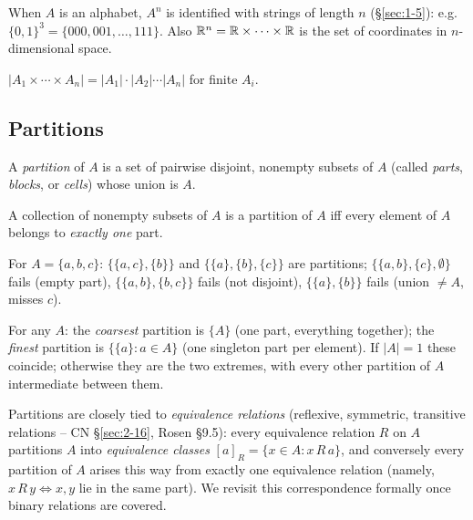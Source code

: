 \documentclass[11pt]{article}
\begin{document}
\begin{note}
When $A$ is an alphabet, $A^n$ is identified with strings of length $n$ (\S\ref{sec:1-5}): e.g.\ $\{0,1\}^3 = \{000,001,\dots,111\}$. Also $\mathbb{R}^n = \mathbb{R}\times\cdots\times\mathbb{R}$ is the set of coordinates in $n$-dimensional space.
\end{note}

\begin{theorem}
$|A_1 \times \cdots \times A_n| = |A_1| \cdot |A_2| \cdots |A_n|$ for finite $A_i$.
\end{theorem}

\subsection{Partitions}
\label{sec:1-15}
\begin{definition}[Partition]
A \emph{partition} of $A$ is a set of pairwise disjoint, nonempty subsets of $A$ (called \emph{parts}, \emph{blocks}, or \emph{cells}) whose union is $A$.
\end{definition}

\begin{note}
A collection of nonempty subsets of $A$ is a partition of $A$ iff every element of $A$ belongs to \emph{exactly one} part.
\end{note}

\begin{example}
For $A = \{a,b,c\}$: $\{\{a,c\},\{b\}\}$ and $\{\{a\},\{b\},\{c\}\}$ are partitions; $\{\{a,b\},\{c\},\emptyset\}$ fails (empty part), $\{\{a,b\},\{b,c\}\}$ fails (not disjoint), $\{\{a\},\{b\}\}$ fails (union $\neq A$, misses $c$).
\end{example}

\begin{definition}
For any $A$: the \emph{coarsest} partition is $\{A\}$ (one part, everything together); the \emph{finest} partition is $\{\{a\} : a \in A\}$ (one singleton part per element). If $|A|=1$ these coincide; otherwise they are the two extremes, with every other partition of $A$ intermediate between them.
\end{definition}

\begin{note}
Partitions are closely tied to \emph{equivalence relations} (reflexive, symmetric, transitive relations -- CN \S\ref{sec:2-16}, Rosen \S9.5): every equivalence relation $R$ on $A$ partitions $A$ into \emph{equivalence classes} $[a]_R = \{x \in A : x\,R\,a\}$, and conversely every partition of $A$ arises this way from exactly one equivalence relation (namely, $x\,R\,y \iff x,y$ lie in the same part). We revisit this correspondence formally once binary relations are covered.
\end{note}
\end{document}
